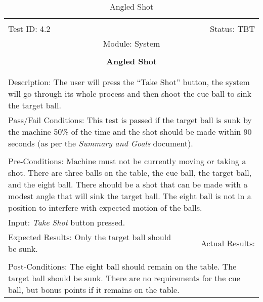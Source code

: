 \documentclass[titlepage]{article}
\begin{document}
\begin{center}%
\begin{table}[h!]
\begin{tabular}{|l r|}\hline&\\[-2mm]
	Test ID: 4.2	&Status: TBT\\[-3mm]
	\multicolumn{2}{|c|}{Module: System}\\&\\
	\multicolumn{2}{|c|}{\textbf{\large{Angled Shot}}}\\&\\\hline&\\[-3mm]
	\multicolumn{2}{|p{\textwidth}|}{Description: The user will press the ``Take Shot'' button, the system will go through its whole process and then shoot the cue ball to sink the target ball.}\\\hline
	\multicolumn{2}{|p{\textwidth}|}{Pass/Fail Conditions: This test is passed if the target ball is sunk by the machine 50\% of the time and the shot should be made within 90 seconds (as per the \textit{Summary and Goals} document).}\\[1mm]\hline&\\[-3mm]
	\multicolumn{2}{|p{\textwidth}|}{Pre-Conditions: Machine must not be currently moving or taking a shot. There are three balls on the table, the cue ball, the target ball, and the eight ball. There should be a shot that can be made with a modest angle that will sink the target ball. The eight ball is not in a position to interfere with expected motion of the balls.}\\[4mm]
	\multicolumn{2}{|p{\textwidth}|}{Input: \textit{Take Shot} button pressed.}\\[2mm]\hline
	\multicolumn{1}{|p{0.49\textwidth}}{Expected Results: Only the target ball should be sunk.}	&\multicolumn{1}{|p{0.45\textwidth}|}{Actual Results: }\\\hline&\\[-3mm]
	\multicolumn{2}{|p{\textwidth}|}{Post-Conditions: The eight ball should remain on the table. The target ball should be sunk. There are no requirements for the cue ball, but bonus points if it remains on the table.}\\\hline
\end{tabular}
\caption{Angled Shot}
\end{table}
\end{center}
\newpage
\end{document}
